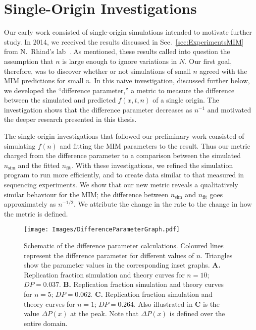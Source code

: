 	\section{Single-Origin Investigations}
	\label{sec:SingleOrigin}
	
	Our early work consisted of single-origin simulations intended to motivate further study.
	In 2014, we received the results discussed in Sec.~\ref{sec:ExperimentsMIM} from N.~Rhind's lab~\cite{Rhind}.
	As mentioned, these results called into question the assumption that $n$ is large enough to ignore variations in $N$.
	Our first goal, therefore, was to discover whether or not simulations of small $n$ agreed with the MIM predictions for small $n$.
	In this naive investigation, discussed further below, we developed the ``difference parameter,'' a metric to measure the difference between the simulated and predicted $f(x,t,n)$ of a single origin.
	The investigation shows that the difference parameter decreases as $n^{-1}$ and motivated the deeper research presented in this thesis.
	
	The single-origin investigations that followed our preliminary work consisted of simulating $f(n)$ and fitting the MIM parameters to the result.
	Thus our metric charged from the difference parameter to a comparison between the simulated $n_\text{sim}$ and the fitted $n_\text{fit}$.
	With these investigations, we refined the simulation program to run more efficiently, and to create data similar to that measured in sequencing experiments.
	We show that our new metric reveals a qualitatively similar behaviour for the MIM; the difference between $n_\text{sim}$ and  $n_\text{fit}$ goes approximately as $n^{-1/2}$.
	We attribute the change in the rate to the change in how the metric is defined.
		
	\begin{figure}[tbh!]
		\begin{center}
			\texttt{[image: Images/DifferenceParameterGraph.pdf]}
		\end{center}
			\caption[Schematic of the Difference Parameter Calculations]{\label{fig:DifferenceParameter} Schematic of the difference parameter calculations.
				Coloured lines represent the difference parameter for different values of $n$.
				Triangles show the parameter values in the corresponding inset graphs.
				\textbf{A.} Replication fraction simulation and theory curves for $n=10$; $DP=0.037$.
				\textbf{B.} Replication fraction simulation and theory curves for $n=5$; $DP = 0.062$.
				\textbf{C.} Replication fraction simulation and theory curves for $n=1$; $DP = 0.264$.
				Also illustrated in \textbf{C} is the value $\Delta P(x)$ at the peak.
				Note that $\Delta P(x)$ is defined over the entire domain.
				}
	\end{figure}
	
